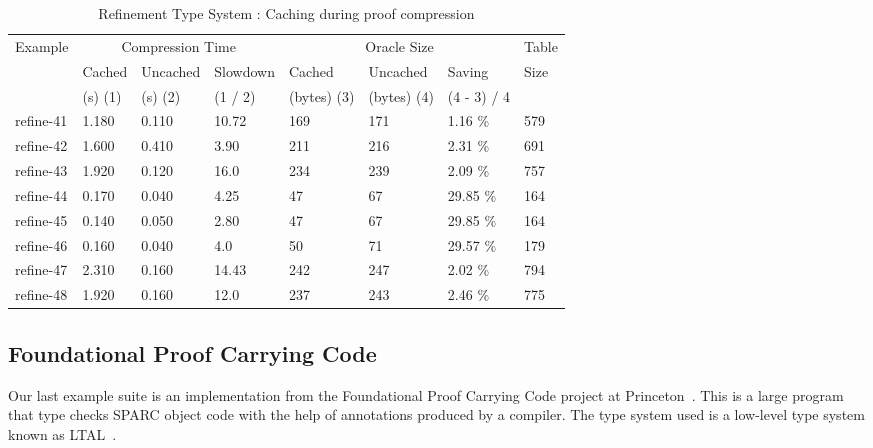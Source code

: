 \documentclass{acmconf}
\begin{document}
\begin{table}[htbp]
\begin{center}
\begin{small}
\begin{tabular}{|l|l|l|l|l|l|l|l|}
\hline
Example & \multicolumn{3}{c}{Compression Time} & 
\multicolumn{3}{c}{Oracle Size} & Table\\
& Cached & Uncached & Slowdown & Cached & Uncached & Saving & Size\\
& (s) (1) & (s) (2) & (1 / 2) & (bytes) (3) & (bytes) (4) & (4 - 3) / 4& \\
\hline
refine-41 & 1.180 & 0.110 & 10.72 & 169 & 171 & 1.16 \% & 579\\
refine-42 & 1.600 & 0.410 & 3.90 & 211 & 216 & 2.31 \% & 691\\
refine-43 & 1.920 & 0.120 & 16.0 & 234 & 239 & 2.09 \% & 757\\
refine-44 & 0.170 & 0.040 & 4.25 & 47 & 67 & 29.85 \% & 164\\
refine-45 & 0.140 & 0.050 & 2.80 & 47 & 67 & 29.85 \% & 164\\
refine-46 & 0.160 & 0.040 & 4.0  & 50 & 71 & 29.57 \% & 179\\
refine-47 & 2.310 & 0.160 & 14.43 & 242 & 247 & 2.02 \% & 794\\
refine-48 & 1.920 & 0.160 & 12.0 & 237 & 243 & 2.46 \% & 775\\
\hline
\end{tabular}
\end{small}
\end{center}
\caption{\label{tab:refcache} 
Refinement Type System : 
Caching during proof compression}
\end{table}

\subsection{Foundational Proof Carrying Code}
Our last example suite is an implementation from the Foundational 
Proof Carrying Code project at Princeton~\cite{Appel01lics}. This 
is a large program that type checks SPARC object code with the help 
of annotations produced by a compiler. The type system used is a
low-level type system known as LTAL~\cite{chen+:fpcc-ltal}.
\end{document}
